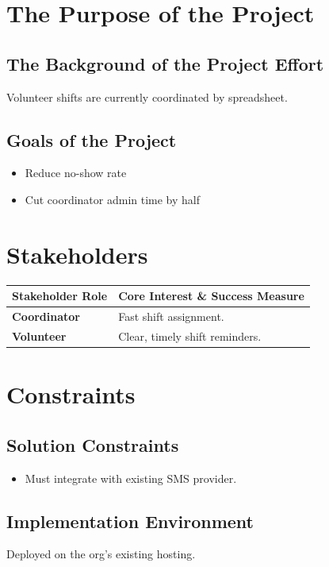 \documentclass[11pt,a4paper]{article}
\begin{document}
\section{The Purpose of the Project}
\subsection{The Background of the Project Effort}
Volunteer shifts are currently coordinated by spreadsheet.

\subsection{Goals of the Project}
\begin{itemize}[leftmargin=*]
    \item Reduce no-show rate
    \item Cut coordinator admin time by half
\end{itemize}

\section{Stakeholders}
\begin{table}[h!]
\centering
\begin{tabularx}{\linewidth}{l X}
\toprule
\textbf{Stakeholder Role} & \textbf{Core Interest \& Success Measure} \\
\midrule
\textbf{Coordinator} & Fast shift assignment. \\
\textbf{Volunteer} & Clear, timely shift reminders. \\
\bottomrule
\end{tabularx}
\end{table}

\section{Constraints}
\subsection{Solution Constraints}
\begin{itemize}[leftmargin=*]
    \item Must integrate with existing SMS provider.
\end{itemize}

\subsection{Implementation Environment}
Deployed on the org's existing hosting.
\end{document}
